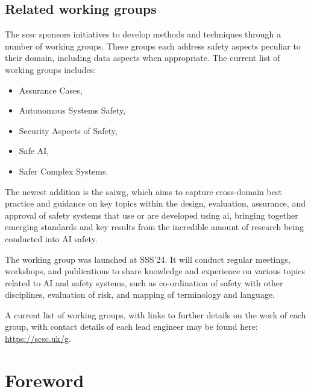 \subsection*{Related working groups}
The \gls{scsc} sponsors initiatives to develop methods and techniques through a number of working groups. These groups each address safety aspects peculiar to their domain, including data aspects when appropriate. The current list of working groups includes:
%
\begin{itemize}
  \item Assurance Cases,
  \item Autonomous Systems Safety,
  \item Security Aspects of Safety,
  \item Safe AI,
  \item Safer Complex Systems. 
\end{itemize}
%
The newest addition is the \acrfull{saiwg}, which aims to capture cross-domain best practice and guidance on key topics within the design, evaluation, assurance, and approval of safety systems that use or are developed using \acrfull{ai}, bringing together emerging standards and key results from the incredible amount of research being conducted into AI safety.

The working group was launched at SSS’24. It will conduct regular meetings, workshops, and publications to share knowledge and experience on various topics related to AI and safety systems, such as co-ordination of safety with other disciplines, evaluation of risk, and mapping of terminology and language.

A current list of working groups, with links to further details on the work of each group, with contact details of each lead engineer may be found here: \href{https://scsc.uk/g}{https://scsc.uk/g}.
%
\clearpage
%

\makeatletter		%
\dsiwg@intblankpage
\makeatother

\pagestyle{FirstPageFrontMatter}
\section*{Foreword}


